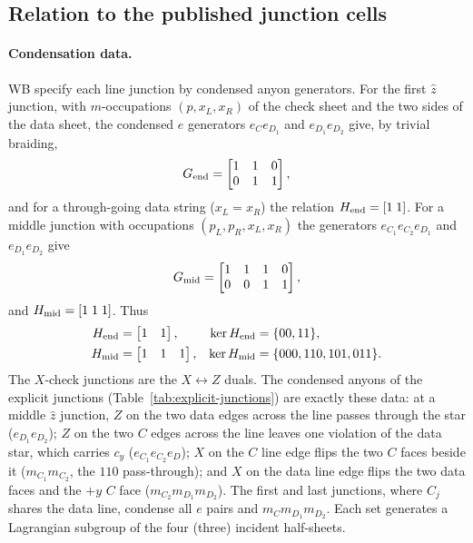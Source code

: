 \documentclass[aps,prx,reprint,superscriptaddress,nofootinbib,floatfix,longbibliography]{revtex4-2}
\theoremstyle{definition}
\begin{document}
\subsection{Relation to the published junction cells}
\label{app:source-trace}

\paragraph{Condensation data.}
WB specify each line junction by condensed anyon generators.  For the first
$\hat z$ junction, with $m$-occupations $(p,x_L,x_R)$ of the check sheet and
the two sides of the data sheet, the condensed $e$ generators
$e_{C}e_{D_1}$ and $e_{D_1}e_{D_2}$ give, by trivial braiding,
\begin{equation}
 G_{\rm end}=\begin{bmatrix}1&1&0\\0&1&1\end{bmatrix},
 \label{eq:source-end}
\end{equation}
and for a through-going data string ($x_L=x_R$) the relation
$H_{\rm end}=[1\;1]$.  For a middle junction with occupations
$(p_L,p_R,x_L,x_R)$ the generators $e_{C_1}e_{C_2}e_{D_1}$ and
$e_{D_1}e_{D_2}$ give
\begin{equation}
 G_{\rm mid}=\begin{bmatrix}1&1&1&0\\0&0&1&1\end{bmatrix},
 \label{eq:source-mid}
\end{equation}
and $H_{\rm mid}=[1\;1\;1]$.  Thus
\begin{align}
 H_{\rm end}&=\begin{bmatrix}1&1\end{bmatrix}, &
 \ker H_{\rm end}&=\{00,11\},\nonumber\\
 H_{\rm mid}&=\begin{bmatrix}1&1&1\end{bmatrix}, &
 \ker H_{\rm mid}&=\{000,110,101,011\}.
 \label{eq:H-end}
\end{align}
The $X$-check junctions are the $X\leftrightarrow Z$ duals.  The condensed
anyons of the explicit junctions (Table~\ref{tab:explicit-junctions}) are
exactly these data: at a middle $\hat z$ junction, $Z$ on the two data edges
across the line passes through the star ($e_{D_1}e_{D_2}$); $Z$ on the two
$C$ edges across the line leaves one violation of the data star, which carries
$c_y$ ($e_{C_1}e_{C_2}e_D$); $X$ on the $C$ line edge flips the two $C$ faces
beside it ($m_{C_1}m_{C_2}$, the $110$ pass-through); and $X$ on the data line
edge flips the two data faces and the $+y$ $C$ face ($m_{C_2}m_{D_1}m_{D_2}$).
The first and last junctions, where $C_j$ shares the data line, condense all
$e$ pairs and $m_Cm_{D_1}m_{D_2}$.  Each set generates a Lagrangian subgroup
of the four (three) incident half-sheets.
\end{document}
